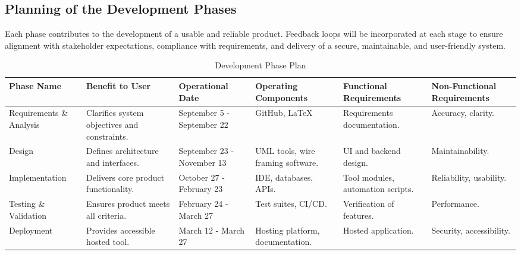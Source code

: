 \documentclass[12pt]{article}
\newcommand{\lips}{\textit{Insert your content here.}}
\begin{document}
\subsection{Planning of the Development Phases}

Each phase contributes to the development of a usable and reliable product. Feedback loops will be incorporated at each stage to ensure alignment with stakeholder expectations, compliance with requirements, and delivery of a secure, maintainable, and user-friendly system.

\begin{table}[H]
\centering
\caption{Development Phase Plan}
\setlength{\tabcolsep}{4pt}
\renewcommand{\arraystretch}{1.2}
\footnotesize

\begin{tabularx}{\textwidth}{p{2.5cm} Y p{2cm} Y Y Y}
\toprule
\textbf{Phase Name} & \textbf{Benefit to User} & \textbf{Operational Date} &
\textbf{Operating Components} & \textbf{Functional Requirements} &
\textbf{Non-Functional Requirements} \\
\midrule
{}

Requirements \& Analysis &
Clarifies system objectives and constraints. &
September 5 - September 22 &
GitHub, LaTeX &
Requirements documentation. &
Accuracy, clarity. \\
\hline
Design &
Defines architecture and interfaces. &
September 23 - November 13 &
UML tools, wire framing software. &
UI and backend design. &
Maintainability. \\
\hline
Implementation &
Delivers core product functionality. &
October 27 - February 23 &
IDE, databases, APIs. &
Tool modules, automation scripts. &
Reliability, usability. \\
\hline
Testing \& Validation &
Ensures product meets all criteria. &
February 24 - March 27 &
Test suites, CI/CD. &
Verification of features. &
Performance. \\
\hline
Deployment &
Provides accessible hosted tool. &
March 12 - March 27 &
Hosting platform, documentation. &
Hosted application. &
Security, accessibility. \\
\bottomrule
\end{tabularx}
\end{table}



\end{document}
